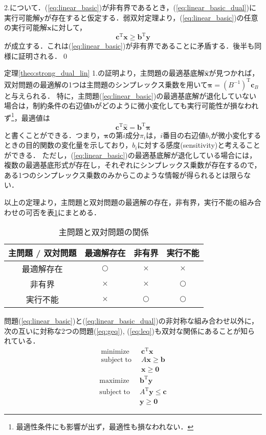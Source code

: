 \documentclass{jsreport}
\begin{document}
2.について．(\ref{eq:linear_basic})が非有界であるとき，(\ref{eq:linear_basic_dual})に実行可能解$\bm{y}$が存在すると仮定する．弱双対定理より，(\ref{eq:linear_basic})の任意の実行可能解$\bm{x}$に対して，
\begin{equation}
  \bm{c}^{\mathrm{T}}\bm{x} \geq \bm{b}^{\mathrm{T}}\bm{y} \nonumber
\end{equation}
が成立する．これは(\ref{eq:linear_basic})が非有界であることに矛盾する．後半も同様に証明される．\qed

定理\ref{theo:strong_dual_lin} 1.の証明より，主問題の最適基底解$\hat{\bm{x}}$が見つかれば，双対問題の最適解の1つは主問題のシンプレックス乗数を用いて$\bm{\pi} = (B^{-1})^{\mathrm{T}}\bm{c}_B$と与えられる．
特に，主問題(\ref{eq:linear_basic})の最適基底解が退化していない場合は，制約条件の右辺値$\bm{b}$がどのように微小変化しても実行可能性が損なわれず\footnote{
最適性条件にも影響が出ず，最適性も損なわれない．
}，最適値は
\begin{equation}
  \bm{c}^{\mathrm{T}}\hat{\bm{x}} = \bm{b}^{\mathrm{T}}\bm{\pi} \nonumber
\end{equation}
と書くことができる．つまり，$\bm{\pi}$の第$i$成分$\pi_i$は，$i$番目の右辺値$b_i$が微小変化するときの目的関数の変化量を示しており，$b_i$に対する感度(sensitivity)と考えることができる．
ただし，(\ref{eq:linear_basic})の最適基底解が退化している場合には，複数の最適基底形式が存在し，それぞれにシンプレックス乗数が存在するので，ある1つのシンプレックス乗数のみからこのような情報が得られるとは限らない．


以上の定理より，主問題と双対問題の最適解の存在，非有界，実行不能の組み合わせの可否を表\ref{tab:exists_opt}にまとめる．
\begin{table}[htb]
  \centering
    \caption{主問題と双対問題の関係}
    \begin{tabular}{|c|c|c|c|}\hline
      主問題 / 双対問題 & 最適解存在 & 非有界 & 実行不能  \\ \hline
      最適解存在 & $\bigcirc$ & $\times$ & $\times$ \\ \hline
      非有界 & $\times$ & $\times$ & $\bigcirc$ \\ \hline
      実行不能 & $\times$ & $\bigcirc$ & $\bigcirc$ \\ \hline
    \end{tabular}
    \label{tab:exists_opt}
\end{table}

問題(\ref{eq:linear_basic})と(\ref{eq:linear_basic_dual})の非対称な組み合わせ以外に，次の互いに対称な2つの問題(\ref{eq:geq}), (\ref{eq:leq})も双対な関係にあることが知られている．
\begin{align}\label{eq:geq}
  \mathrm{minimize} \; \; &\bm{c}^{\mathrm{T}}\bm{x} \nonumber \\
  \mathrm{subject \; to} \; \; &A\bm{x} \geq \bm{b} \\
  &\bm{x} \geq \bm{0} \nonumber
\end{align}
\begin{align}\label{eq:leq}
  \mathrm{maximize} \; \; &\bm{b}^{\mathrm{T}}\bm{y} \nonumber \\
  \mathrm{subject \; to} \; \; &A^{\mathrm{T}}\bm{y} \leq \bm{c} \\
  &\bm{y} \geq \bm{0} \nonumber
\end{align}
\end{document}
